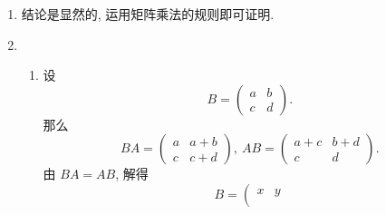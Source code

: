 \begin{enumerate}
\begin{proof}
\begin{align*}
\begin{array}{cccc}
                        \vdots &  & \vdots \\
                        \dfrac{a_{1n}+a_{n1}}{2} & \cdots & a_{nn}
                    \end{array}
                \right)
                +
                \left(
                    \begin{array}{cccc}
                        0 & \cdots & \dfrac{a_{1n}-a_{n1}}{2} \\
                        \vdots &  & \vdots \\
                        -\dfrac{a_{1n}-a_{n1}}{2} & \cdots & 0
                    \end{array}
                \right). \qedhere 
            \end{align*}
        \end{proof}
    \item %
        结论是显然的, 运用矩阵乘法的规则即可证明.
    \item %
        \begin{enumerate}[(1)]
            \item %
                设
                \[
                    B =
                    \left(
                        \begin{array}{cccc}
                            a & b \\
                            c & d
                        \end{array}
                    \right).    
                \]
                那么
                \[
                    BA =
                    \left(
                        \begin{array}{cccc}
                            a & a+b \\
                            c & c+d
                        \end{array}
                    \right),\ 
                    AB =
                    \left(
                        \begin{array}{cccc}
                            a+c & b+d \\
                            c & d
                        \end{array}
                    \right).
                \]
                由 $BA = AB$, 解得
                \[
                    B =
                    \left(
                        \begin{array}{cccc}
                            x & y \\

\end{array}\]
\end{enumerate}
\end{enumerate}
